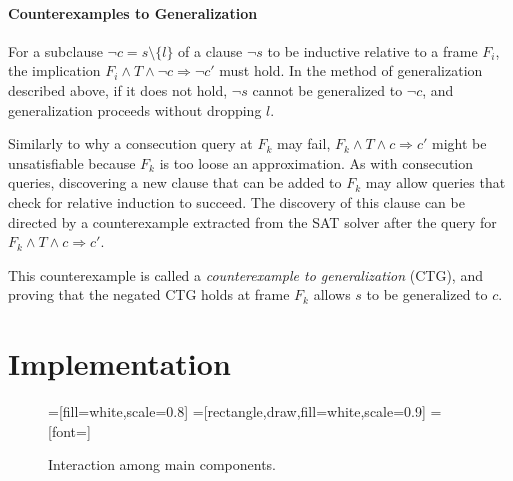 \documentclass[12pt,a4paper,twoside,openright]{report}
\begin{document}
{{%

\subsubsection{Counterexamples to Generalization}

For a subclause $\neg c = s \setminus \{l\}$ of a clause $\neg s$ to be
inductive relative to a frame $F_i$, the implication
$F_i \wedge T \wedge \neg c \Rightarrow \neg c'$ must hold.
In the method of generalization described above,
if it does not hold,
$\neg s$ cannot be generalized to $\neg c$, and generalization
proceeds without dropping $l$.

Similarly to why a consecution query at $F_k$ may fail,
$F_k \wedge T \wedge c \Rightarrow c'$ might be unsatisfiable because
$F_k$ is too loose an approximation. As with consecution queries, discovering a
new clause that can be added to $F_k$ may allow queries that
check for relative induction to succeed. The discovery of this
clause can be directed by a counterexample extracted from the
SAT solver after the query for $F_k \wedge T \wedge c \Rightarrow c'$.

This counterexample is called a \emph{counterexample
to generalization} (CTG), and proving that the negated CTG holds at
frame $F_k$ allows $s$ to be generalized to $c$.


\chapter{Implementation}
\label{impl}

\begin{figure}[t]
=[fill=white,scale=0.8]
=[rectangle,draw,fill=white,scale=0.9]
=[font=\footnotesize]
\caption{Interaction among main components.}
\label{components}
\end{figure}

}}
\end{document}
